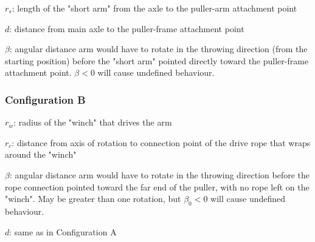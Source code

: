 \documentclass{article}
\begin{document}
\begin{description}
\item $r_s$: length of the "short arm" from the axle to the puller-arm attachment point
\item $d$: distance from main axle to the puller-frame attachment point
\item $\beta$: angular distance arm would have to rotate in the throwing direction (from the starting position) before the "short arm" pointed directly toward the puller-frame attachment point. $\beta < 0$ will cause undefined behaviour.
\end{description}

\subsubsection{Configuration B}

\begin{description}
\item $r_w$: radius of the "winch" that drives the arm
\item $r_c$: distance from axis of rotation to connection point of the drive rope that wraps around the "winch"
\item $\beta$: angular distance arm would have to rotate in the throwing direction before the rope connection pointed toward the far end of the puller, with no rope left on the "winch". May be greater than one rotation, but $\beta_0 < 0$ will cause undefined behaviour.
\item $d$: same as in Configuration A
\end{description}
\end{document}
